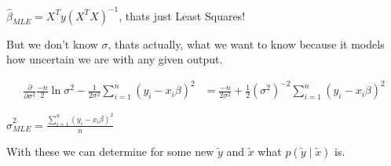$\hat\beta_{MLE} = X^Ty(X^TX)^{-1}$, thats just Least Squares!

But we don't know $\sigma$, thats actually, what we want to know because it models how uncertain we are with any given output.

\begin{align*}
\frac{\partial}{\partial\sigma^2} \frac{-n}{2}\ln \sigma^2 -\frac{1}{2\sigma^2}\sum_{i=1}^{n} (y_i-x_i\beta)^2 &= \frac{-n}{2\sigma^2} +\frac{1}{2}(\sigma^2)^{-2}\sum_{i=1}^{n} (y_i-x_i\beta)^2
\end{align*}

$\hat\sigma^2_{MLE} = \frac{\sum_{i=1}^{n} (y_i-x_i\beta)^2}{n}$

With these we can determine for some new $\tilde y$ and $\tilde x$ what $p(\tilde y \mid \tilde x)$ is. 

